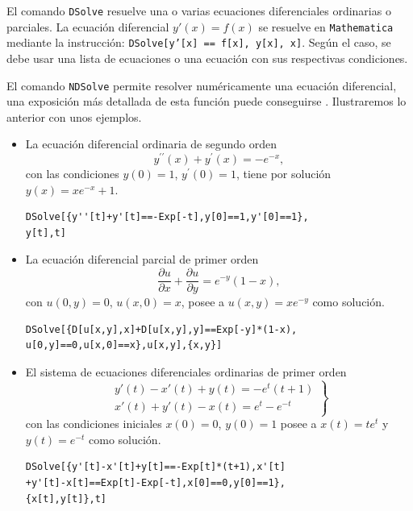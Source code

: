 \begin{graybox}
El comando \texttt{DSolve} resuelve una o varias ecuaciones diferenciales ordinarias o parciales.
La ecuación diferencial $y'(x) = f(x)$ se resuelve en \texttt{Mathematica} mediante la instrucción:
\texttt{DSolve[y'[x] == f[x], y[x], x]}.
Según el caso, se debe usar una lista de ecuaciones o una ecuación con sus respectivas condiciones.
\end{graybox}

El comando \verb"NDSolve" permite resolver numéricamente una ecuación diferencial,
una exposición más detallada de esta función puede conseguirse \textcite{sofroniou_advanced_2008}. Ilustraremos lo anterior con unos ejemplos.
\begin{itemize}
\item La ecuación diferencial ordinaria de segundo orden
\[ y^{\prime \prime }\left( x\right) + y^{\prime }\left(x\right) =-e^{-x},\] con las condiciones
$y\left( 0\right) =1$, $y^{\prime }\left( 0\right) =1$, tiene por solución $y\left( x\right) =xe^{-x}+1$.
\begin{tcolorbox}
\begin{Verbatim}[formatcom=\letraverbatim]
DSolve[{y''[t]+y'[t]==-Exp[-t],y[0]==1,y'[0]==1},
y[t],t]
\end{Verbatim}
\end{tcolorbox}

\item La ecuación diferencial parcial de primer orden
\[\frac{\partial u}{\partial x}+\frac{\partial u}{\partial y}=e^{-y}\left(1-x\right) ,\] con $u\left( 0,y\right) =0$, $u\left( x,0\right) =x$, posee a $u\left( x,y\right) =xe^{-y}$ como solución.

\begin{tcolorbox}
\begin{Verbatim}[formatcom=\letraverbatim]
DSolve[{D[u[x,y],x]+D[u[x,y],y]==Exp[-y]*(1-x),
u[0,y]==0,u[x,0]==x},u[x,y],{x,y}]
\end{Verbatim}
\end{tcolorbox}

\item El sistema de ecuaciones diferenciales ordinarias de primer orden
$$\left.
\begin{array}{l}
  y'(t)-x'(t)+y(t)=-e^t(t+1)\\
  x'(t)+y'(t)-x(t)=e^t-e^{-t}
\end{array}\right \}$$
con las condiciones iniciales $x(0)=0$, $y(0)=1$ posee a $x(t)= te^t$ y $y(t)=e^{-t}$ como solución.

\begin{tcolorbox}[title=Instrucciones en Mathematica]
\begin{Verbatim}[formatcom=\letraverbatim]
DSolve[{y'[t]-x'[t]+y[t]==-Exp[t]*(t+1),x'[t]
+y'[t]-x[t]==Exp[t]-Exp[-t],x[0]==0,y[0]==1},
{x[t],y[t]},t]
\end{Verbatim}
\end{tcolorbox}

\end{itemize}

